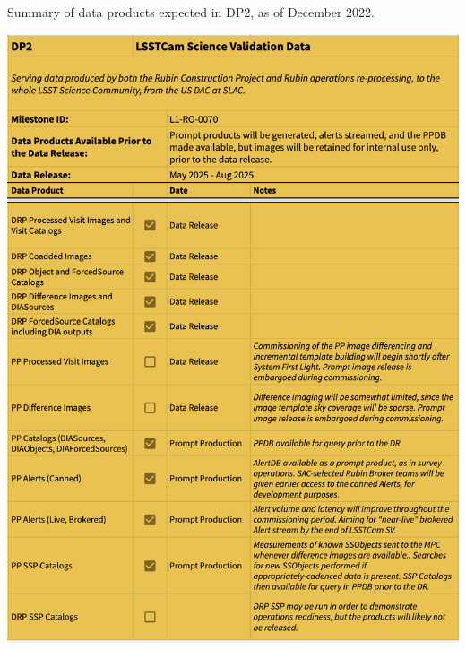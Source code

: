 \begin{table}
\caption{Summary of data products expected in DP2, as of December 2022.}
\label{tab:dp-two-products}
\includegraphics[width=\linewidth]{figures/DP2-products}
\end{table}

